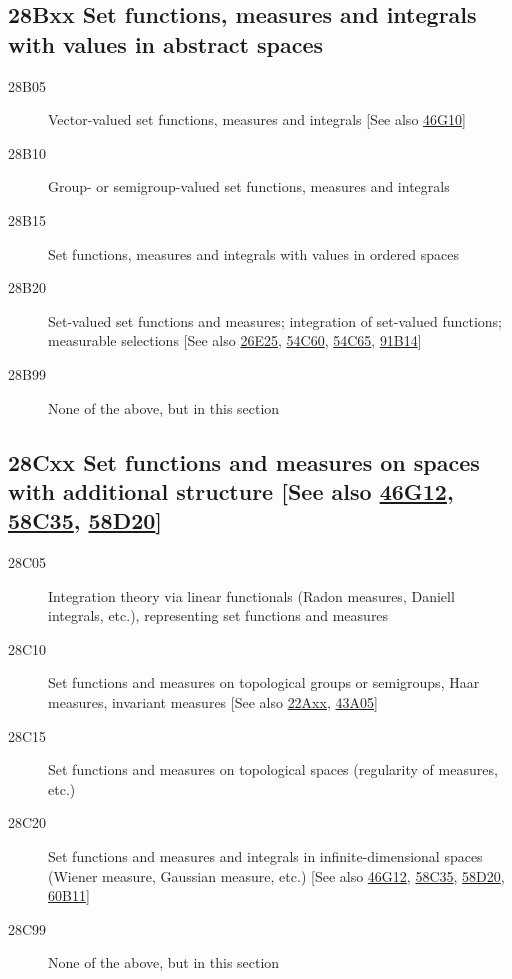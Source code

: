 \subsection*{28Bxx  Set functions, measures and integrals with values in abstract spaces }\label{28Bxx}
\begin{description}  
\item [28B05]\label{28B05} Vector-valued set functions, measures and integrals [See also \hyperref[46G10]{46G10}]
\item [28B10]\label{28B10} Group- or semigroup-valued set functions, measures and integrals
\item [28B15]\label{28B15} Set functions, measures and integrals with values in ordered spaces
\item [28B20]\label{28B20} Set-valued set functions and measures; integration of set-valued functions; measurable selections [See also \hyperref[26E25]{26E25}, \hyperref[54C60]{54C60}, \hyperref[54C65]{54C65}, \hyperref[91B14]{91B14}]
\item [28B99]\label{28B99} None of the above, but in this section
\end{description}
\subsection*{28Cxx  Set functions and measures on spaces with additional structure [See also \hyperref[46G12]{46G12}, \hyperref[58C35]{58C35}, \hyperref[58D20]{58D20}] }\label{28Cxx}
\begin{description}  
\item [28C05]\label{28C05} Integration theory via linear functionals (Radon measures, Daniell integrals, etc.), representing set functions and measures
\item [28C10]\label{28C10} Set functions and measures on topological groups or semigroups, Haar measures, invariant measures [See also \hyperref[22Axx]{22Axx}, \hyperref[43A05]{43A05}]
\item [28C15]\label{28C15} Set functions and measures on topological spaces (regularity of measures, etc.)
\item [28C20]\label{28C20} Set functions and measures and integrals in infinite-dimensional spaces (Wiener measure, Gaussian measure, etc.) [See also \hyperref[46G12]{46G12}, \hyperref[58C35]{58C35}, \hyperref[58D20]{58D20}, \hyperref[60B11]{60B11}]
\item [28C99]\label{28C99} None of the above, but in this section
\end{description}
